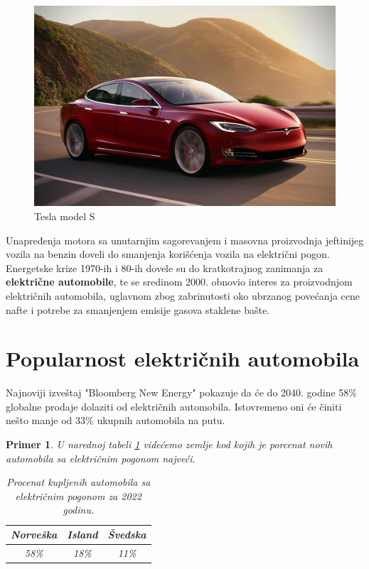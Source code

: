 \documentclass[a4paper]{article}
\newtheorem{primer}{Primer}[section]
\begin{document}
\begin{figure}[h]
        \centering
        \includegraphics[width=\linewidth]{tesla.jpeg}
        \caption{Tesla model S}
        \label{fig:IMG_Tesla}
        \end{figure}
        Unapređenja motora sa unutarnjim sagorevanjem i masovna proizvodnja jeftinijeg vozila na benzin doveli do smanjenja korišćenja vozila na električni pogon.
         Energetske krize 1970-ih i 80-ih dovele su do kratkotrajnog zanimanja za \textbf{električne automobile}, te se sredinom 2000. obnovio interes za proizvodnjom električnih automobila, uglavnom zbog zabrinutosti oko ubrzanog povećanja cene nafte i potrebe za smanjenjem emisije gasova staklene bašte.
         
\label{sec:uvod}






\section{Popularnost električnih automobila}
\label{slike_i_tabele}

Najnoviji izveštaj "Bloomberg New Energy" pokazuje da će do 2040. godine 58\% globalne prodaje dolaziti od električnih automobila. Istovremeno oni će činiti nešto manje od 33\% ukupnih automobila na putu.




\begin{primer} U narednoj tabeli \ref{tab:tabela1} videćemo zemlje kod kojih je porcenat novih automobila sa električnim pogonom najveći.


\begin{table}[h!]
\begin{center}
\caption{Procenat kupljenih automobila sa električnim pogonom za 2022 godinu.}
\begin{tabular}{|c|c|c|} \hline
Norveška& Island& Švedska\\ \hline
58\% &18\%&11\%\\ \hline
\end{tabular}
\label{tab:tabela1}
\end{center}
\end{table}

\end{primer}
\end{document}
